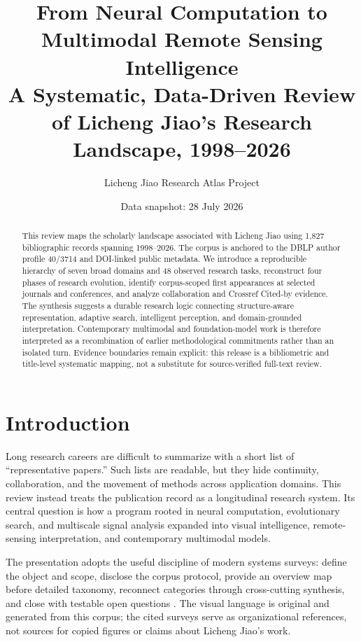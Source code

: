 \documentclass[11pt]{article}
\title{\textbf{From Neural Computation to Multimodal Remote Sensing Intelligence}\\[0.5em]
\large A Systematic, Data-Driven Review of Licheng Jiao's Research Landscape, 1998--2026}
\author{Licheng Jiao Research Atlas Project}
\date{Data snapshot: 28 July 2026}
\begin{document}
\maketitle

\begin{abstract}
This review maps the scholarly landscape associated with Licheng Jiao using
1,827 bibliographic records spanning 1998--2026. The corpus is anchored to the
DBLP author profile 40/3714 and DOI-linked public metadata. We introduce a
reproducible hierarchy of seven broad domains and 48 observed research tasks,
reconstruct four phases of research evolution, identify corpus-scoped first
appearances at selected journals and conferences, and analyze collaboration and
Crossref Cited-by evidence. The synthesis suggests a durable research logic
connecting structure-aware representation, adaptive search, intelligent
perception, and domain-grounded interpretation. Contemporary multimodal and
foundation-model work is therefore interpreted as a recombination of earlier
methodological commitments rather than an isolated turn. Evidence boundaries
remain explicit: this release is a bibliometric and title-level systematic
mapping, not a substitute for source-verified full-text review.
\end{abstract}

\section{Introduction}

Long research careers are difficult to summarize with a short list of
``representative papers.'' Such lists are readable, but they hide continuity,
collaboration, and the movement of methods across application domains. This
review instead treats the publication record as a longitudinal research system.
Its central question is how a program rooted in neural computation,
evolutionary search, and multiscale signal analysis expanded into visual
intelligence, remote-sensing interpretation, and contemporary multimodal
models.

The presentation adopts the useful discipline of modern systems surveys:
define the object and scope, disclose the corpus protocol, provide an overview
map before detailed taxonomy, reconnect categories through cross-cutting
synthesis, and close with testable open questions
\cite{li2026harness,ren2026selfimprovement}. The visual language is original
and generated from this corpus; the cited surveys serve as organizational
references, not sources for copied figures or claims about Licheng Jiao's work.
\end{document}
